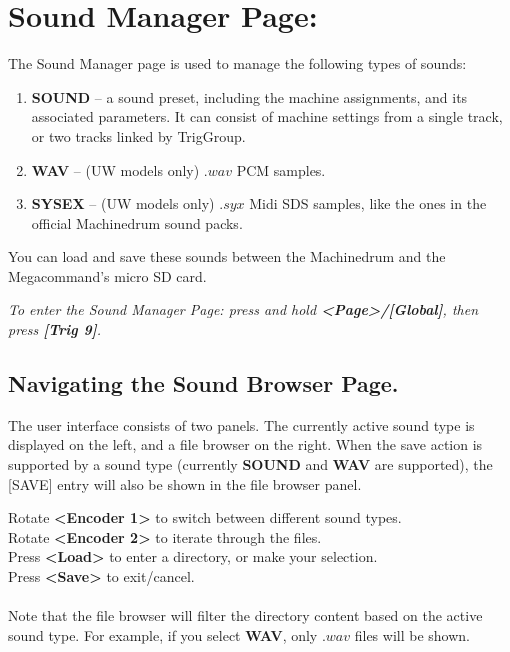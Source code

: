 \chapter{Sound Manager Page:}
The Sound Manager page is used to manage the following types of sounds: 
\begin{enumerate}
    \item \textbf{SOUND} -- a sound preset, including the machine assignments, and its associated parameters. It can consist of machine settings from a single track, or two tracks linked by TrigGroup.
    \item \textbf{WAV} -- (UW models only) $.wav$ PCM samples.
    \item \textbf{SYSEX} -- (UW models only) $.syx$ Midi SDS samples, like the ones in the official Machinedrum sound packs.
\end{enumerate}
You can load and save these sounds between the Machinedrum and the Megacommand's micro SD card.

\textit{To enter the Sound Manager Page: press and hold \textbf{<Page>/[Global]}, then press \textbf{[Trig 9]}.}

\section{Navigating the Sound Browser Page.}

The user interface consists of two panels. The currently active sound type is displayed on the left, and a file browser on the right. When the save action is supported by a sound type (currently \textbf{SOUND} and \textbf{WAV} are supported), the [SAVE] entry will also be shown in the file browser panel.


Rotate \textbf{<Encoder 1>} to switch between different sound types.\\
Rotate \textbf{<Encoder 2>} to iterate through the files.\\
Press \textbf{<Load>} to enter a directory, or make your selection.\\
Press \textbf{<Save>} to exit/cancel.\\
\\
Note that the file browser will filter the directory content based on the active sound type. For example, if you select \textbf{WAV}, only $.wav$ files will be shown.
 
